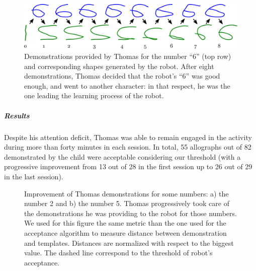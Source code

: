 \documentclass[10pt,a4paper]{article}
\begin{document}
\begin{figure}[!]
    \centering
    \includegraphics[width=0.6\linewidth]{learning_6_demos}
    \caption{\small Demonstrations provided by Thomas for the number ``6'' (top row) and
        corresponding shapes generated by the robot. After eight demonstrations,
        Thomas decided that the robot's ``6'' was good enough, and went to
    another character: in that respect, he was the one leading the learning
process of the robot.}
    \label{learning_6_demos}
\end{figure}
\subparagraph{Results}
Despite his attention deficit, Thomas was able to remain engaged in the activity during more than
forty minutes in each session. In total, 55 allographs out of 82 
demonstrated by the child were acceptable considering our threshold (with a
progressive improvement from 13 out of 28 in the first session up to 26 out
of 29 in the last session).

\begin{figure}[!]
    \centering
    \caption{\small Improvement of Thomas demonstrations for some numbers: a) the number 2 and b) the number 5. Thomas progressively took care of the demonstrations he was providing to the robot for those numbers. We used for this figure the same metric than the one used for the acceptance algorithm to measure distance between demonstration and templates. Distances are normalized with respect to the biggest value. The dashed line correspond to the threshold of robot's acceptance.}
    \label{Thomas_progress}
\end{figure}
\end{document}
